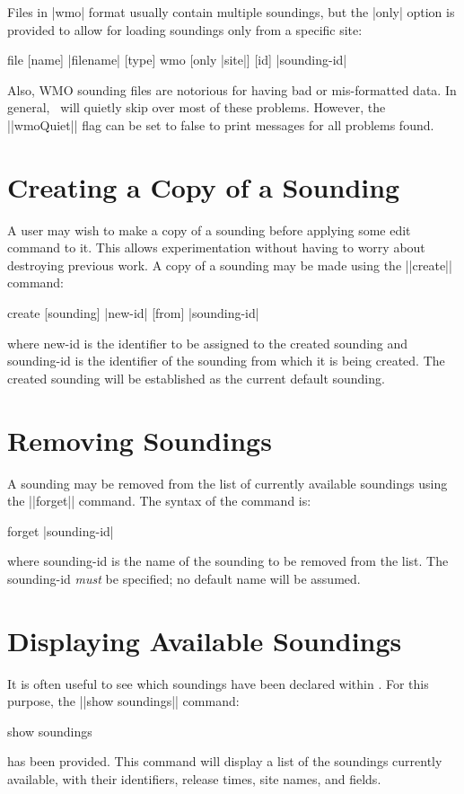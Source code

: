 Files in |wmo| format usually contain multiple soundings, but the |only|
option is provided to allow for loading soundings only from a specific site:
\begin{example}
	file [name] |filename| [type] wmo [only |site|] [id] |sounding-id|
\end{example}
Also, WMO sounding files are notorious for having bad or mis-formatted
data.  In general, \suds\ will quietly skip over most of these problems.
However, the ||wmoQuiet|| flag can be set to false to print messages for
all problems found.

\section {Creating a Copy of a Sounding}
A user may wish to make a copy of a sounding before applying some
edit command to it.  This allows experimentation without having to worry
about destroying previous work.
A copy of a sounding may be made using the ||create|| command:
\begin{example}
	create [sounding] |new-id| [from] |sounding-id|
\end{example}
where {\pf new-id} is the identifier to be assigned to the created sounding
and {\pf sounding-id} is the identifier of the sounding from which it is being
created.
The created sounding will be 
established as the current default sounding.


\section{Removing Soundings}
A sounding may be removed from the list of currently available soundings
using the ||forget|| command.  The syntax of the command is:
\begin{example}
	forget |sounding-id|
\end{example}
where {\pf sounding-id} is the name of the sounding to be removed from the 
list.  The {\pf sounding-id} {\it must} be specified; no default name will
be assumed.

\section{Displaying Available Soundings}

It is often useful to see which soundings have been declared within \suds.
For this purpose, the ||show soundings|| command:
\begin{example}
	show soundings
\end{example}
has been provided.  This command will display a list of the soundings 
currently available, with their identifiers, release times, site names, and
fields.


